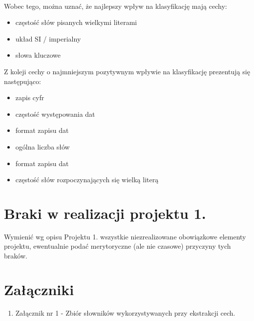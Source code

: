 \documentclass{classrep}
\begin{document}
\\ Wobec tego, można uznać, że najlepszy wpływ na klasyfikację mają cechy: 
\begin{itemize}
    \item częstość słów pisanych wielkymi literami
    \item układ SI / imperialny
    \item słowa kluczowe
\end{itemize}
Z koleji cechy o najmniejszym pozytywnym wpływie na klasyfikację prezentują się następująco:
\begin{itemize}
    \item zapis cyfr
    \item częstość występowania dat
    \item format zapisu dat
    \item ogólna liczba słów
    \item format zapisu dat
    \item częstość słów rozpoczynających się wielką literą
\end{itemize}


\section{Braki w realizacji projektu 1.}
Wymienić wg opisu Projektu 1. wszystkie niezrealizowane obowiązkowe elementy projektu, ewentualnie
podać merytoryczne (ale nie czasowe) przyczyny tych braków. 

\section*{Załączniki}
\begin{enumerate}
   \item Załącznik nr 1 - Zbiór słowników wykorzystywanych przy ekstrakcji cech.
\end{enumerate}
\end{document}
